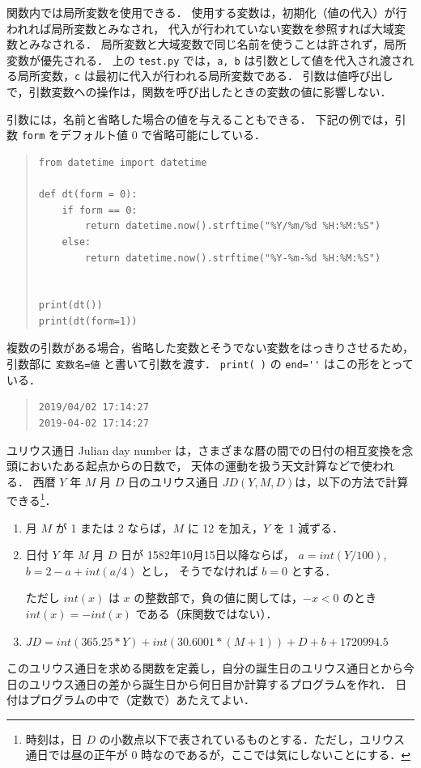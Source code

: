 \documentclass[11pt,a4,epsf]{report}
\begin{document}
関数内では局所変数を使用できる．
使用する変数は，初期化（値の代入）が行われれば局所変数とみなされ，
代入が行われていない変数を参照すれば大域変数とみなされる．
局所変数と大域変数で同じ名前を使うことは許されず，局所変数が優先される．
上の \verb+test.py+ では，\verb+a, b+ は引数として値を代入され渡される局所変数，\verb+c+ は最初に代入が行われる局所変数である．
引数は値呼び出しで，引数変数への操作は，関数を呼び出したときの変数の値に影響しない．

引数には，名前と省略した場合の値を与えることもできる．
下記の例では，引数 \verb+form+ をデフォルト値 0 で省略可能にしている．
\begin{quote}
\small
\begin{verbatim}
from datetime import datetime

def dt(form = 0):
    if form == 0:
        return datetime.now().strftime("%Y/%m/%d %H:%M:%S")
    else:
        return datetime.now().strftime("%Y-%m-%d %H:%M:%S")


print(dt())
print(dt(form=1))
\end{verbatim}
\end{quote}
複数の引数がある場合，省略した変数とそうでない変数をはっきりさせるため，引数部に \verb+変数名=値+ と書いて引数を渡す．
\verb+print( )+ の \verb+end=''+ はこの形をとっている．
\begin{quote}
\small
\begin{verbatim}
2019/04/02 17:14:27
2019-04-02 17:14:27
\end{verbatim}
\end{quote}

\begin{excercise}
ユリウス通日 Julian day number は，さまざまな暦の間での日付の相互変換を念頭においたある起点からの日数で，
天体の運動を扱う天文計算などで使われる．
西暦 $Y$ 年 $M$ 月 $D$ 日のユリウス通日 $\mathit{JD}(Y,M,D)$は，以下の方法で計算できる\footnote{時刻は，日 $D$ の小数点以下で表されているものとする．ただし，ユリウス通日では昼の正午が 0 時なのであるが，ここでは気にしないことにする．}．
\begin{enumerate}
\item
月 $M$ が 1 または 2 ならば，$M$ に 12 を加え，$Y$ を 1 減ずる．
\item
日付 $Y$ 年 $M$ 月 $D$ 日が 1582年10月15日以降ならば，
$a = int(Y/100)$, $b=2 - a + int(a/4)$ とし，
そうでなければ $b=0$ とする．

ただし $int(x)$ は $x$ の整数部で，負の値に関しては，$-x < 0$ のとき $\mathit{int}(x) = -\mathit{int}(x)$ である（床関数ではない）．
\item
$JD = \mathit{int}(365.25 * Y) + \mathit{int}(30.6001 * (M+1)) + D + b + 1720994.5$
\end{enumerate}

このユリウス通日を求める関数を定義し，自分の誕生日のユリウス通日とから今日のユリウス通日の差から誕生日から何日目か計算するプログラムを作れ．
日付はプログラムの中で（定数で）あたえてよい．
\end{excercise}
\end{document}
